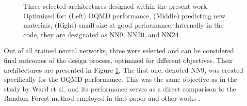 \begin{figure}[H]
    \centering
    \hspace{6pt}
    \hspace{6pt}
    \caption{Three selected architectures designed within the present work. Optimized for: (Left) OQMD performance, (Middle) predicting new materials, (Right) small size at good performance. Internally in the code, they are designated as NN9, NN20, and NN24.}
    \label{sipfenn:fig:architectures}
    \vspace{-6pt}
\end{figure}

Out of all trained neural networks, three were selected and can be considered final outcomes of the design process, optimized for different objectives. Their architectures are presented in Figure \ref{sipfenn:fig:architectures}. The first one, denoted NN9, was created specifically for the OQMD performance. This was the same objective as in the study by Ward et al. \cite{Ward2017IncludingTessellations} and its performance serves as a direct comparison to the Random Forest method employed in that paper \cite{Ward2017IncludingTessellations} and other works \cite{Schutt2014HowProperties, Seko2017RepresentationProperties}.


